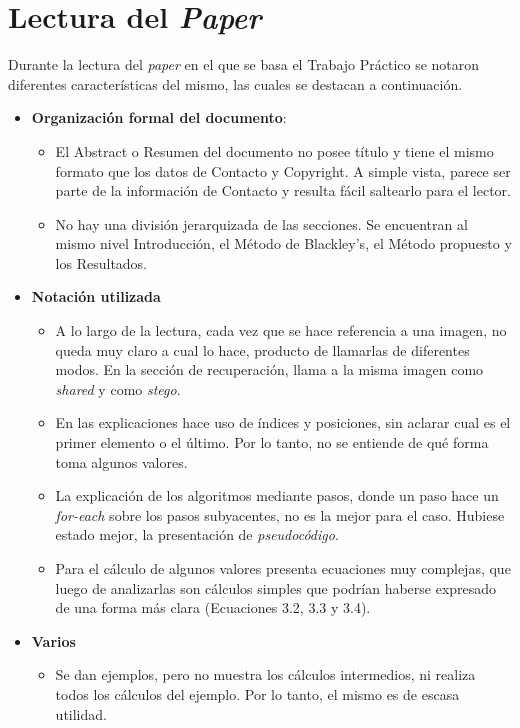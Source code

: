 \documentclass{article}
\begin{document}
\section{Lectura del \emph{Paper}}

Durante la lectura del \emph{paper} en el que se basa el Trabajo Práctico se notaron diferentes características del mismo,
las cuales se destacan a continuación.

\begin{itemize}
 \item \textbf{Organización formal del documento}:
 \begin{itemize}
  \item El Abstract o Resumen del documento no posee título y tiene el mismo formato que los datos de Contacto y Copyright. A simple vista,
  parece ser parte de la información de Contacto y resulta fácil saltearlo para el lector.
  \item No hay una división jerarquizada de las secciones. Se encuentran al mismo nivel Introducción, el Método de Blackley's, el Método propuesto y
  los Resultados.
 \end{itemize}
 
 \item \textbf{Notación utilizada}
 \begin{itemize}
  \item A lo largo de la lectura, cada vez que se hace referencia a una imagen, no queda muy claro a cual lo hace, producto de llamarlas
  de diferentes modos. En la sección de recuperación, llama a la misma imagen como \emph{shared} y como \emph{stego}.
  \item En las explicaciones hace uso de índices y posiciones, sin aclarar cual es el primer elemento o el último. Por lo tanto,
  no se entiende de qué forma toma algunos valores.
  \item La explicación de los algoritmos mediante pasos, donde un paso hace un \emph{for-each} sobre los pasos subyacentes, no es la mejor
  para el caso. Hubiese estado mejor, la presentación de \emph{pseudocódigo}.
  \item Para el cálculo de algunos valores presenta ecuaciones muy complejas, que luego de analizarlas son cálculos simples que podrían
  haberse expresado de una forma más clara (Ecuaciones 3.2, 3.3 y 3.4).
 \end{itemize}
 
 \item \textbf{Varios}
 \begin{itemize}
  \item Se dan ejemplos, pero no muestra los cálculos intermedios, ni realiza todos los cálculos del ejemplo. Por lo tanto, el mismo es de escasa utilidad.
 \end{itemize}
\end{itemize}
\end{document}
